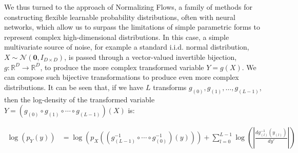 \documentclass{scrartcl} %
\begin{document}
	We thus turned to the approach of Normalizing Flows, a family of methods for constructing flexible learnable probability distributions, often with neural networks, which allow us to surpass the limitations of simple parametric forms to represent complex high-dimensional distributions. In this case, a simple multivariate source of noise, for example a standard i.i.d. normal distribution, $X\sim\mathcal{N}(\mathbf{0},I_{D\times D})$, is passed through a vector-valued invertible bijection, $g:\mathbb{R}^D\rightarrow\mathbb{R}^D$, to produce the more complex transformed variable $Y=g(X)$.
%	
%
%
We can compose such bijective transformations to produce even more complex distributions. It can be seen that, if we have $L$ transforms $g_{(0)}, g_{(1)},\ldots,g_{(L-1)}$, then the log-density of the transformed variable $Y=(g_{(0)}\circ g_{(1)}\circ\cdots\circ g_{(L-1)})(X)$ is:

\begin{equation*}
	\begin{aligned}
		\log(p_Y(y)) &= \log\left(p_X\left(\left(g_{(L-1)}^{-1}\circ\cdots\circ g_{(0)}^{-1}\right)\left(y\right)\right)\right)+\sum^{L-1}_{l=0}\log\left(\left|\frac{dg^{-1}_{(l)}(y_{(l)})}{dy'}\right|\right)
	\end{aligned}
\end{equation*}
\end{document}
